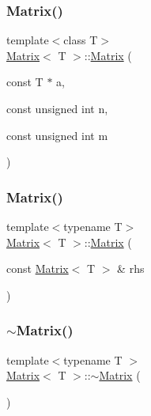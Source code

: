 \subsubsection{\texorpdfstring{Matrix()}{Matrix()}\hspace{0.1cm}{\footnotesize\ttfamily [6/7]}}
{\footnotesize\ttfamily template$<$class T$>$ \\
\mbox{\hyperlink{classMatrix}{Matrix}}$<$ T $>$\+::\mbox{\hyperlink{classMatrix}{Matrix}} (\begin{DoxyParamCaption}\item[{const T $\ast$}]{a,  }\item[{const unsigned int}]{n,  }\item[{const unsigned int}]{m }\end{DoxyParamCaption})}

\mbox{\label{classMatrix_a6a46705243036bfeee78fe2c84c54340_a6a46705243036bfeee78fe2c84c54340}} 
\subsubsection{\texorpdfstring{Matrix()}{Matrix()}\hspace{0.1cm}{\footnotesize\ttfamily [7/7]}}
{\footnotesize\ttfamily template$<$typename T$>$ \\
\mbox{\hyperlink{classMatrix}{Matrix}}$<$ T $>$\+::\mbox{\hyperlink{classMatrix}{Matrix}} (\begin{DoxyParamCaption}\item[{const \mbox{\hyperlink{classMatrix}{Matrix}}$<$ T $>$ \&}]{rhs }\end{DoxyParamCaption})}

\mbox{\label{classMatrix_a91aa704de674203e96aece9e1955ccd3_a91aa704de674203e96aece9e1955ccd3}} 
\subsubsection{\texorpdfstring{$\sim$\+Matrix()}{~Matrix()}}
{\footnotesize\ttfamily template$<$typename T $>$ \\
\mbox{\hyperlink{classMatrix}{Matrix}}$<$ T $>$\+::$\sim$\mbox{\hyperlink{classMatrix}{Matrix}} (\begin{DoxyParamCaption}{ }\end{DoxyParamCaption})}



